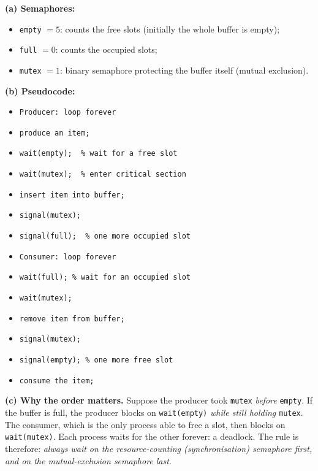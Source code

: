 \documentclass[11pt]{article}
\newcommand{\cle}[1]{{\popxbold\color{popdark}#1}}
\begin{document}
\begin{corrige}
\textbf{(a) Semaphores:}
\begin{itemize}
\item \texttt{empty} $= 5$: counts the free slots (initially the whole buffer is empty);
\item \texttt{full} $= 0$: counts the occupied slots;
\item \texttt{mutex} $= 1$: binary semaphore protecting the buffer itself (mutual exclusion).
\end{itemize}
\textbf{(b) Pseudocode:}
\begin{itemize}
\item \texttt{Producer: loop forever}
\item \texttt{\quad produce an item;}
\item \texttt{\quad wait(empty); \quad\quad\quad\ \% wait for a free slot}
\item \texttt{\quad wait(mutex); \quad\quad\quad\ \% enter critical section}
\item \texttt{\quad insert item into buffer;}
\item \texttt{\quad signal(mutex);}
\item \texttt{\quad signal(full); \quad\quad\quad\ \% one more occupied slot}
\item \texttt{Consumer: loop forever}
\item \texttt{\quad wait(full); \quad\quad\quad\quad \% wait for an occupied slot}
\item \texttt{\quad wait(mutex);}
\item \texttt{\quad remove item from buffer;}
\item \texttt{\quad signal(mutex);}
\item \texttt{\quad signal(empty); \quad\quad\quad \% one more free slot}
\item \texttt{\quad consume the item;}
\end{itemize}
\textbf{(c) Why the order matters.} Suppose the producer took \texttt{mutex} \emph{before} \texttt{empty}. If the buffer is full, the producer blocks on \texttt{wait(empty)} \emph{while still holding} \texttt{mutex}. The consumer, which is the only process able to free a slot, then blocks on \texttt{wait(mutex)}. Each process waits for the other forever: a \cle{deadlock}. The rule is therefore: \emph{always wait on the resource-counting (synchronisation) semaphore first, and on the mutual-exclusion semaphore last}.
\end{corrige}
\end{document}
